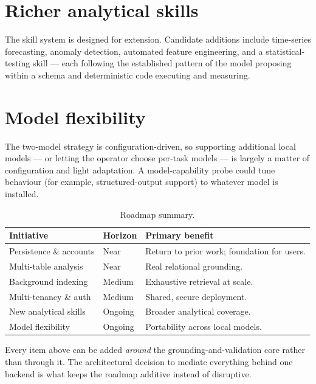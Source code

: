 \section{Richer analytical skills}
The skill system is designed for extension. Candidate additions include
time-series forecasting, anomaly detection, automated feature engineering, and a
statistical-testing skill --- each following the established pattern of the model
proposing within a schema and deterministic code executing and measuring.

\section{Model flexibility}
The two-model strategy is configuration-driven, so supporting additional local
models --- or letting the operator choose per-task models --- is largely a matter
of configuration and light adaptation. A model-capability probe could tune
behaviour (for example, structured-output support) to whatever model is
installed.

\begin{table}[h]
\centering
\caption{Roadmap summary.}
\small
\begin{tabularx}{\linewidth}{@{}L{4.6cm} L{2.4cm} X@{}}
\toprule
\textbf{Initiative} & \textbf{Horizon} & \textbf{Primary benefit} \\
\midrule
Persistence \& accounts & Near & Return to prior work; foundation for users. \\
Multi-table analysis & Near & Real relational grounding. \\
Background indexing & Medium & Exhaustive retrieval at scale. \\
Multi-tenancy \& auth & Medium & Shared, secure deployment. \\
New analytical skills & Ongoing & Broader analytical coverage. \\
Model flexibility & Ongoing & Portability across local models. \\
\bottomrule
\end{tabularx}
\end{table}

\begin{uanote}
Every item above can be added \emph{around} the grounding-and-validation core
rather than through it. The architectural decision to mediate everything behind
one backend is what keeps the roadmap additive instead of disruptive.
\end{uanote}
